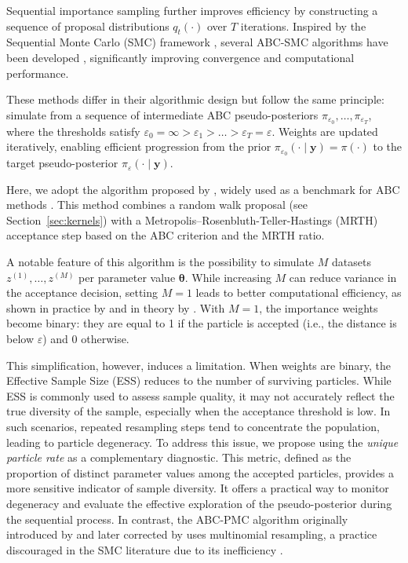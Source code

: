 \documentclass[11pt,a4paper]{article}
\def\obsdata{\mathbf{y}}
\def\param{\boldsymbol{\theta}}
\theoremstyle{plain}
\theoremstyle{definition}
\theoremstyle{remark}
\begin{document}
Sequential importance sampling further improves efficiency by constructing a sequence of proposal distributions \( q_t(\cdot) \) over \( T \) iterations. Inspired by the Sequential Monte Carlo (SMC) framework \citep{delmoralSequentialMonteCarlo2006a}, several ABC-SMC algorithms have been developed \citep{sisson2007sequential,sissonCorrectionSissonSequential2009, toniApproximateBayesianComputation2008, beaumontAdaptiveApproximateBayesian2009b, delmoralAdaptiveSequentialMonte2012}, significantly improving convergence and computational performance.

These methods differ in their algorithmic design but follow the same principle: simulate from a sequence of intermediate ABC pseudo-posteriors \( \pi_{\varepsilon_0}, \dots, \pi_{\varepsilon_T} \), where the thresholds satisfy \( \varepsilon_0 = \infty > \varepsilon_1 > \dots > \varepsilon_T = \varepsilon \). Weights are updated iteratively, enabling efficient progression from the prior \( \pi_{\varepsilon_0}(\cdot \mid \obsdata) = \pi(\cdot) \) to the target pseudo-posterior \( \pi_\varepsilon(\cdot \mid \obsdata) \).

Here, we adopt the algorithm proposed by \citet{delmoralAdaptiveSequentialMonte2012}, widely used as a benchmark for ABC methods \citep{clarte2021componentwise}. This method combines a random walk proposal (see Section~\ref{sec:kernels}) with a Metropolis–Rosenbluth-Teller-Hastings (MRTH) acceptance step based on the ABC criterion and the MRTH ratio. 

A notable feature of this algorithm is the possibility to simulate \( M \) datasets \( z^{(1)}, \dots, z^{(M)} \) per parameter value \( \param \). 
While increasing \( M \) can reduce variance in the acceptance decision, setting \( M = 1 \) leads to better computational efficiency, as shown in practice by \citet{delmoralAdaptiveSequentialMonte2012} and in theory by \citet{bornn2017use}. 
With $M=1$, the importance weights become binary: they are equal to 1 if the particle is accepted (i.e., the distance is below \( \varepsilon \)) and 0 otherwise.

This simplification, however, induces a limitation. When weights are binary, the Effective Sample Size (ESS) reduces to the number of surviving particles. While ESS is commonly used to assess sample quality, it may not accurately reflect the true diversity of the sample, especially when the acceptance threshold is low. In such scenarios, repeated resampling steps tend to concentrate the population, leading to particle degeneracy. 
To address this issue, we propose using the \emph{unique particle rate} as a complementary diagnostic. This metric, defined as the proportion of distinct parameter values among the accepted particles, provides a more sensitive indicator of sample diversity. It offers a practical way to monitor degeneracy and evaluate the effective exploration of the pseudo-posterior during the sequential process. 
In contrast, the ABC-PMC algorithm originally introduced by \citet{sissonCorrectionSissonSequential2009} and later corrected by \citet{beaumontAdaptiveApproximateBayesian2009b} uses multinomial resampling, a practice discouraged in the SMC literature due to its inefficiency \citep{chopin2020introduction}.
\end{document}
